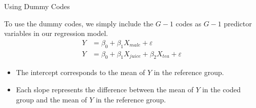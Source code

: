 \documentclass{beamer}\usepackage[]{graphicx}\usepackage[]{color}
\begin{document}

\begin{frame}{Using Dummy Codes}
  
  To use the dummy codes, we simply include the $G - 1$ codes as $G - 1$
  predictor variables in our regression model.
  \begin{align*}
    Y &= \beta_0 + \beta_1 X_{male} + \varepsilon\\[6pt]
    Y &= \beta_0 + \beta_1 X_{juice} + \beta_2 X_{tea} + \varepsilon
  \end{align*}
  \begin{itemize}
  \item The intercept corresponds to the mean of $Y$ in the reference group.
    \vb
  \item Each slope represents the difference between the mean of $Y$ in the 
    coded group and the mean of $Y$ in the reference group.
  \end{itemize}
  
\end{frame}

\watermarkoff %
\end{document}
